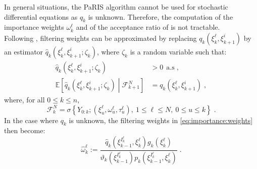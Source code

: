 \documentclass[12pt,draft]{article}
\newcommand{\eqsp}{\;}
\newcommand{\1}{\mathrm{1}}
\newcommand{\qk}{q_{k}}
\begin{document}
In general situations, the PaRIS algorithm cannot be used for stochastic differential equations as $\qk$ is unknown. Therefore, the computation of the importance weights $\omega_{k}^{\ell}$ and of the acceptance ratio of \cite{douc:garivier:moulines:olsson:2011} is not tractable.\\
Following \cite{fearnhead:papaspiliopoulos:roberts:2008,olsson:strojby:2011}, filtering weights can be approximated by replacing $\qk(\xi^{\ell}_{k},\xi_{k+1}^{i})$  by an  estimator $\widehat{q}_k(\xi^{\ell}_{k},\xi_{k+1}^{i};\zeta_k)$, where $\zeta_k$ is a random variable such that:
\begin{align*}
\widehat{q}_k(\xi^{\ell}_{k},\xi_{k+1}^{i};\zeta_k)&> 0~~\text{a.s}\eqsp,\\
\mathbb{E}\left[\widehat{q}_k(\xi^{\ell}_{k},\xi_{k+1}^{i};\zeta_k)\middle| \mathcal{F}_{k+1}^N\right] &= \qk(\xi^{\ell}_{k},\xi_{k+1}^{i})\eqsp,
\end{align*}
where, for all $0\le k \le n$, 
\[
\mathcal{F}_{k}^N = \sigma\left\{Y_{0:k};(\xi^{\ell}_{u},\omega^{\ell}_{u},\tau^{\ell}_{u}),~1\le \ell\le N,~0\le u\le k\right\}\eqsp.
\]
In the case where $\qk$ is unknown, the filtering weights in \eqref{eq:importance:weights} then become:
\begin{equation}
\label{eq:random:weight}
\widehat{\omega}^{\ell}_k := \frac{\widehat{q}_k(\xi_{k-1}^{I^{\ell}_k},\xi^{\ell}_k)g_k(\xi^{\ell}_k)}{\vartheta_k(\xi^{I^{\ell}_k}_{k-1}) p_k (\xi_{k-1}^{I^{\ell}_k},\xi^{\ell}_k)}\eqsp.
\end{equation}
\end{document}
